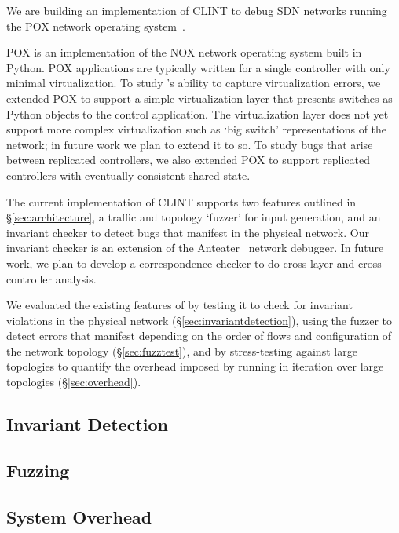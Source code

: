     We are building an implementation of CLINT to debug SDN networks running the POX network operating system~\cite{pox}.
    
    POX is an implementation of the NOX network operating system built in Python.
    POX applications are typically written for a single controller with only minimal virtualization.
    To study \projectname{}'s ability to capture virtualization errors, we extended POX
    to support a simple virtualization layer that presents switches as Python objects to the control application.
    The virtualization layer does not yet support more complex virtualization such as `big switch' representations 
    of the network; in future work we plan to extend it to so.
    To study bugs that arise between replicated controllers, we also extended POX to support replicated controllers
    with eventually-consistent shared state.

    The current implementation of CLINT supports two features outlined in \S\ref{sec:architecture}, a traffic and topology `fuzzer' for input generation, and an invariant checker to detect bugs that manifest in the physical network.
    Our invariant checker is an extension of the Anteater~\cite{anteater} network debugger.
    In future work, we plan to develop a correspondence checker to do cross-layer and cross-controller analysis.

    We evaluated the existing features of \projectname{} by testing it to check for invariant violations in the physical network (\S\ref{sec:invariantdetection}), using the fuzzer to detect errors that manifest depending on the order of flows and configuration of the network topology (\S\ref{sec:fuzztest}), and by stress-testing \projectname{} against large topologies to quantify the overhead imposed by running \projectname{} in iteration over large topologies (\S\ref{sec:overhead}). 
    \subsection{Invariant Detection}

    \subsection{Fuzzing}

        
    \subsection{System Overhead}

